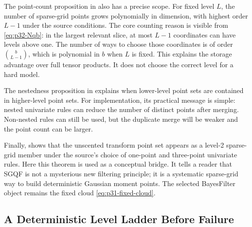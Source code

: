 \documentclass[11pt]{article}
\numberwithin{equation}{section}
\begin{document}
The point-count proposition in \citet[Proposition 3.1]{jia2012sparsegrid}
also has a precise scope.  For fixed level \(L\), the number of sparse-grid
points grows polynomially in dimension, with highest order \(L-1\) under the
source conditions.  The core counting reason is visible from
\eqref{eq:p32-Nqb}: in the largest relevant slice, at most \(L-1\) coordinates
can have levels above one.  The number of ways to choose those coordinates is
of order \(\binom{b}{L-1}\), which is polynomial in \(b\) when \(L\) is fixed.
This explains the storage advantage over full tensor products.  It does not
choose the correct level for a hard model.

The nestedness proposition in \citet[Proposition 3.2]{jia2012sparsegrid}
explains when lower-level point sets are contained in higher-level point sets.
For implementation, its practical message is simple: nested univariate rules
can reduce the number of distinct points after merging.  Non-nested rules can
still be used, but the duplicate merge will be weaker and the point count can
be larger.

Finally, \citet[Theorem 3.2]{jia2012sparsegrid} shows that the unscented
transform point set appears as a level-2 sparse-grid member under the source's
choice of one-point and three-point univariate rules.  Here this theorem is
used as a conceptual bridge.  It tells a reader that SGQF is not a mysterious
new filtering principle; it is a systematic sparse-grid way to build
deterministic Gaussian moment points.  The selected BayesFilter object remains
the fixed cloud \eqref{eq:p31-fixed-cloud}.

\subsection{A Deterministic Level Ladder Before Failure}
\label{subsec:p32-level-ladder}
\end{document}
